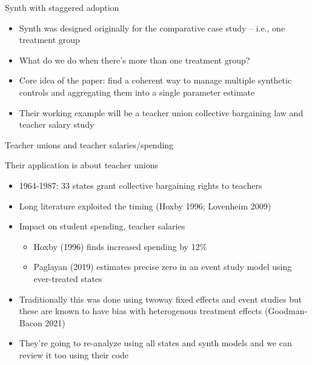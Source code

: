 \documentclass{beamer}
\begin{document}
\begin{frame}{Synth with staggered adoption}

\begin{itemize}
\item Synth was designed originally for the comparative case study -- i.e., one treatment group
\item What do we do when there's more than one treatment group?
\item Core idea of the paper:  find a coherent way to manage multiple synthetic controls and aggregating them into a single parameter estimate
\item Their working example will be a teacher union collective bargaining law and teacher salary study
\end{itemize}

\end{frame}





\begin{frame}{Teacher unions and teacher salaries/spending}

Their application is about teacher unions
\begin{itemize}
\item 1964-1987: 33 states grant collective bargaining rights to teachers
\item Long literature exploited the timing (Hoxby 1996; Lovenheim 2009)
\item Impact on student spending, teacher salaries
	\begin{itemize}
	\item Hoxby (1996) finds increased spending by 12\%
	\item Paglayan (2019) estimates precise zero in an event study model using ever-treated states
	\end{itemize}
\item Traditionally this was done using twoway fixed effects and event studies but these are known to have bias with heterogenous treatment effects (Goodman-Bacon 2021)
\item They're going to re-analyze using all states and synth models and we can review it too using their code
\end{itemize}

\end{frame}
\end{document}
